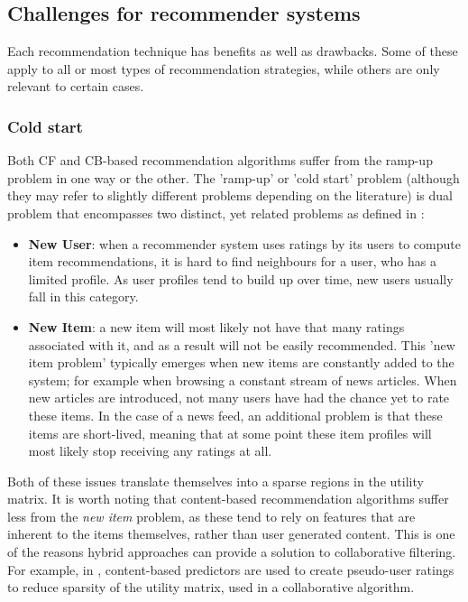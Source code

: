 \subsection{Challenges for recommender systems}\label{chapter:literature_study:section:computer:subsection:challenges}

Each recommendation technique has benefits as well as drawbacks. Some of these apply to all or most types of recommendation strategies, while others are only relevant to certain cases.

\subsubsection{Cold start}

Both CF and CB-based recommendation algorithms suffer from the ramp-up problem in one way or the other. The 'ramp-up' or 'cold start' problem (although they may refer to slightly different problems depending on the literature) is dual problem that encompasses two distinct, yet related problems as defined in \cite{burke:2002}:

\begin{itemize}
	\item \textbf{New User}: when a recommender system uses ratings by its users to compute item recommendations, it is hard to find neighbours for a user, who has a limited profile. As user profiles tend to build up over time, new users usually fall in this category.
	\item \textbf{New Item}: a new item will most likely not have that many ratings associated with it, and as a result will not be easily recommended. This 'new item problem' typically emerges when new items are constantly added to the system; for example when browsing a constant stream of news articles. When new articles are introduced, not many users have had the chance yet to rate these items. In the case of a news feed, an additional problem is that these items are short-lived, meaning that at some point these item profiles will most likely stop receiving any ratings at all.
\end{itemize}

Both of these issues translate themselves into a sparse regions in the utility matrix. It is worth noting that content-based recommendation algorithms suffer less from the \emph{new item} problem, as these tend to rely on features that are inherent to the items themselves, rather than user generated content. This is one of the reasons hybrid approaches can provide a solution to collaborative filtering\cite{burke:2002}. For example, in \cite{melville:2002:CCF:777092.777124}, content-based predictors are used to create pseudo-user ratings to reduce sparsity of the utility matrix, used in a collaborative algorithm.


